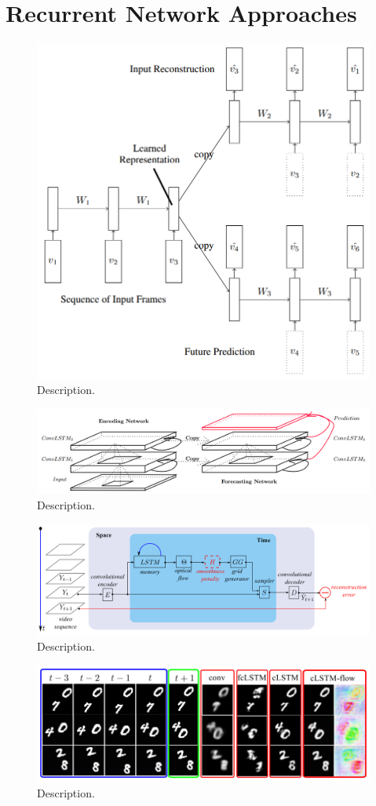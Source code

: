 \section{Recurrent Network Approaches}

\begin{figure}[htb]
	\centering
	\includegraphics[width=0.5\linewidth]{figures/related/combo_shrinked.png} 
	\caption[Short]{Description.} \label{fig:lstm_combo}
\end{figure}


\begin{figure}[htb]
	\centering
	\includegraphics[width=0.8\linewidth]{figures/related/nowcasting_model.png} 
	\caption[Short]{Description.} \label{fig:convlstm_model}
\end{figure}


\begin{figure}[htb]
	\centering
	\includegraphics[width=0.8\linewidth]{figures/related/spat_temp_video.png} 
	\caption[Short]{Description.} \label{fig:spatiotemp_model}
\end{figure}


\begin{figure}[htb]
	\centering
	\includegraphics[width=1.0\linewidth]{figures/related/spat_temp_results.png} 
	\caption[Short]{Description.} \label{fig:spatiotemp_results}
\end{figure}


